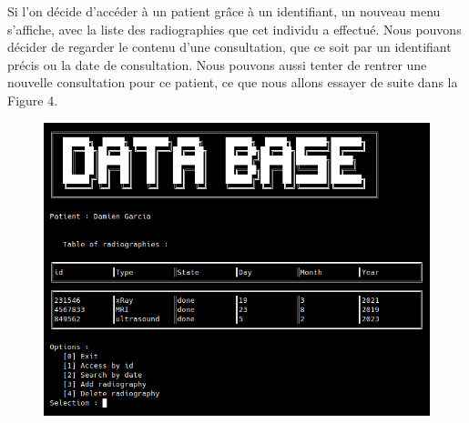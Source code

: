 \documentclass[12pt,a4paper]{article}
\begin{document}
\begin{multicols}{2}
		Si l'on décide d'accéder à un patient grâce à un identifiant, un nouveau menu s'affiche, avec la liste des radiographies que cet individu a effectué. Nous pouvons décider de regarder le contenu d'une consultation, que ce soit par un identifiant précis ou la date de consultation. Nous pouvons aussi tenter de rentrer une nouvelle consultation pour ce patient, ce que nous allons essayer de suite dans la Figure 4.
				
		\begin{figure}
			\centering
			\includegraphics[width=\linewidth]{images/walkthrough/doctor_patient_main.png}
			\label{fig:menu_patient}
		\end{figure}

	\end{multicols}
	
\end{document}
